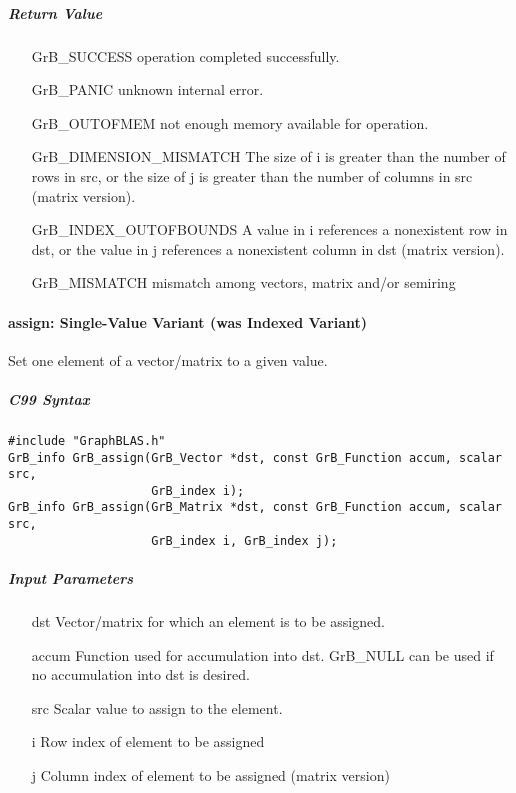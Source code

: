 \subparagraph{Return Value}



\begin{itemize}
\item[{\sf GrB\_SUCCESS}] 	operation completed successfully.
\item[{\sf GrB\_PANIC}]	    unknown internal error.
\item[{\sf GrB\_OUTOFMEM}]	not enough memory available for operation.
\item[{\sf GrB\_DIMENSION\_MISMATCH}] 
        The size of i is greater than the number of rows in src, or
        the size of j is greater than the number of columns in src (matrix version).
\item[{\sf GrB\_INDEX\_OUTOFBOUNDS}]
        A value in i references a nonexistent row in dst, or
	    the value in j references a nonexistent column in dst (matrix version).
\item[\sf GrB\_MISMATCH]  
	   mismatch among vectors, matrix and/or semiring 
\end{itemize}


\paragraph{{\sf assign}: Single-Value Variant (was Indexed Variant)}

Set one element of a vector/matrix to a given value.

\subparagraph{C99 Syntax}

\begin{verbatim}
#include "GraphBLAS.h"
GrB_info GrB_assign(GrB_Vector *dst, const GrB_Function accum, scalar src,
                    GrB_index i);
GrB_info GrB_assign(GrB_Matrix *dst, const GrB_Function accum, scalar src,
                    GrB_index i, GrB_index j);
\end{verbatim}

\subparagraph{Input Parameters}

\begin{itemize}
	\item[{\sf dst}] Vector/matrix for which an element is to be assigned.
	\item[{\sf accum}] Function used for accumulation into dst.  {\sf GrB\_NULL}
                       can be used if no accumulation into dst is desired.
	\item[{\sf src}] Scalar value to assign to the element.
	\item[{\sf i}]   Row index of element to be assigned
	\item[{\sf j}]   Column index of element to be assigned (matrix version)
\end{itemize}

